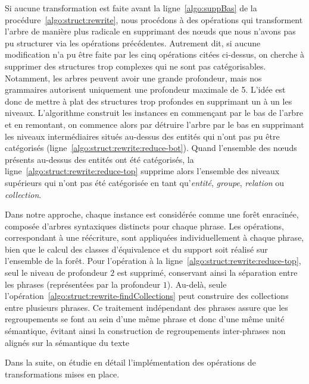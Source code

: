Si aucune transformation est faite avant la ligne~\ref{algo:suppBas} de la procédure~\ref{algo:struct:rewrite},
nous procédons à des opérations qui transforment l'arbre de manière plus radicale en supprimant des nœuds que nous n'avons pas pu structurer via les opérations précédentes.
Autrement dit, si aucune modification n'a pu être faite par les cinq opérations citées ci-dessus, on cherche à supprimer des structures trop complexes qui ne sont pas catégorisables.
Notamment, les arbres peuvent avoir une grande profondeur, mais nos grammaires autorisent uniquement une profondeur maximale de 5.
L'idée est donc de mettre à plat des structures trop profondes en supprimant un à un les niveaux.
L'algorithme construit les instances en commençant par le bas de l'arbre et en remontant, on commence alors par détruire l'arbre par le bas en supprimant les niveaux intermédiaires situés au-dessus des entités qui n'ont pas pu être catégorisés (ligne~\ref{algo:struct:rewrite:reduce-bot}).
Quand l'ensemble des nœuds présents au-dessus des entités ont été catégorisés, la ligne~\ref{algo:struct:rewrite:reduce-top} supprime alors l'ensemble des niveaux supérieurs qui n'ont pas été catégorisée en tant qu'\emph{entité}, \emph{groupe}, \emph{relation} ou \emph{collection}.

\begin{remark}
    Dans notre approche, chaque instance est considérée comme une forêt enracinée, composée d'arbres syntaxiques distincts pour chaque phrase.
    Les opérations, correspondant à une réécriture, sont appliquées individuellement à chaque phrase, bien que le calcul des classes d'équivalence et du support soit réalisé sur l'ensemble de la forêt.
    Pour l'opération à la ligne~\ref{algo:struct:rewrite:reduce-top}, seul le niveau de profondeur $2$ est supprimé, conservant ainsi la séparation entre les phrases (représentées par la profondeur $1$).
    Au-delà, seule l'opération~\ref{algo:struct:rewrite-findCollections} peut construire des collections entre plusieurs phrases.
    Ce traitement indépendant des phrases assure que les regroupements se font au sein d'une même phrase et donc d'une même unité sémantique, évitant ainsi la construction de regroupements inter-phrases non alignés sur la sémantique du texte
\end{remark}

\noindent
Dans la suite, on étudie en détail l'implémentation des opérations de transformations mises en place.

\FloatBarrier
